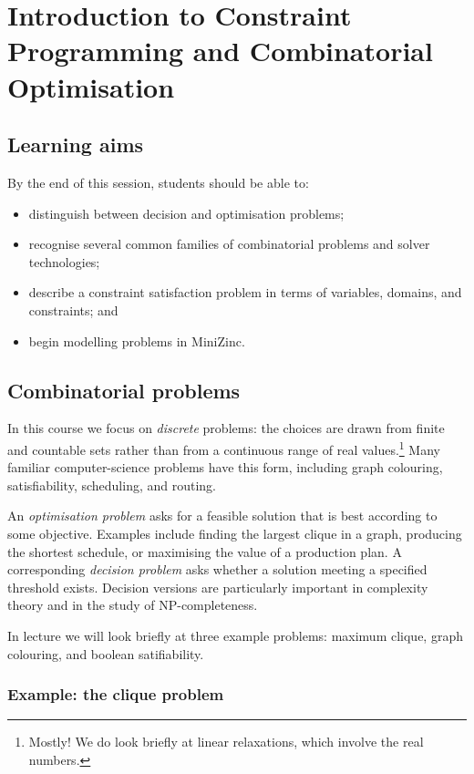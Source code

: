 \documentclass[11pt]{article}
\begin{document}
\section{Introduction to Constraint Programming and Combinatorial Optimisation}

\subsection{Learning aims}

By the end of this session, students should be able to:
\begin{itemize}
    \item distinguish between decision and optimisation problems;
    \item recognise several common families of combinatorial problems and solver technologies;
    \item describe a constraint satisfaction problem in terms of variables, domains, and constraints; and
    \item begin modelling problems in MiniZinc.
\end{itemize}

\subsection{Combinatorial problems}

In this course we focus on \emph{discrete} problems: the choices are drawn from
finite and countable sets rather than from a continuous range of real
values.\footnote{Mostly! We do look briefly at linear relaxations, which involve the real numbers.}
Many familiar computer-science problems have this form, including graph
colouring, satisfiability, scheduling, and routing.

An \emph{optimisation problem} asks for a feasible solution that is best
according to some objective. Examples include finding the largest clique in a
graph, producing the shortest schedule, or maximising the value of a production
plan. A corresponding \emph{decision problem} asks whether a solution meeting a
specified threshold exists. Decision versions are particularly important in
complexity theory and in the study of NP-completeness.


In lecture we will look briefly at three example problems: maximum clique, graph colouring, and boolean satifiability. 

\subsubsection{Example: the clique problem}
\end{document}
